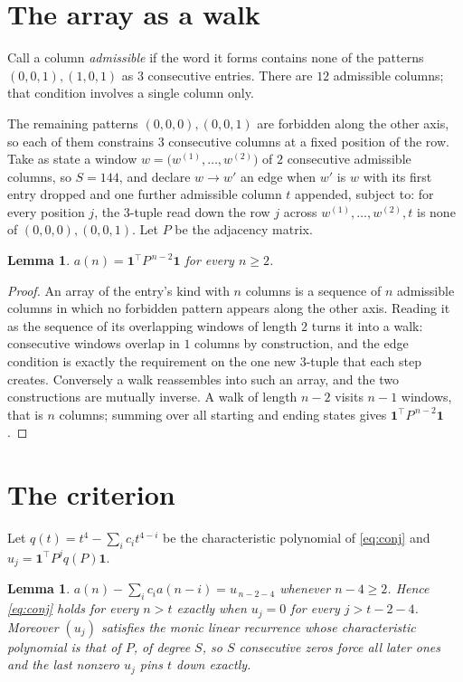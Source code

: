 \documentclass[11pt,a4paper]{article}
\theoremstyle{plain}
\newtheorem{lemma}[theorem]{Lemma}
\theoremstyle{definition}
\begin{document}
\section{The array as a walk}

Call a column \emph{admissible} if the word it forms contains none of the patterns
$(0,0,1), (1,0,1)$ as $3$ consecutive entries. There are $12$ admissible columns; that condition
involves a single column only.

The remaining patterns $(0,0,0), (0,0,1)$ are forbidden along the other axis, so each of them
constrains $3$ consecutive columns at a fixed position of the row. Take as state a
window $w=\bigl(w^{(1)},\dots,w^{(2)}\bigr)$ of $2$ consecutive admissible
columns, so $S=144$, and declare $w\to w'$ an edge when $w'$ is $w$ with its first entry
dropped and one further admissible column $t$ appended, subject to: for every position
$j$, the $3$-tuple read down the row $j$ across $w^{(1)},\dots,w^{(2)},t$
is none of $(0,0,0), (0,0,1)$. Let $P$ be the adjacency matrix.

\begin{lemma}\label{lem:walk}
$a(n)=\mathbf{1}^{\!\top}P^{\,n-2}\mathbf{1}$ for every $n\ge2$.
\end{lemma}

\begin{proof}
An array of the entry's kind with $n$ columns is a sequence of $n$ admissible columns in
which no forbidden pattern appears along the other axis. Reading it as the sequence of its
overlapping windows of length $2$ turns it into a walk: consecutive windows overlap in
$1$ columns by construction, and the edge condition is exactly the requirement on the one
new $3$-tuple that each step creates. Conversely a walk reassembles into such an array,
and the two constructions are mutually inverse. A walk of length $n-2$ visits $n-1$
windows, that is $n$ columns; summing over all starting and ending states gives
$\mathbf{1}^{\!\top}P^{\,n-2}\mathbf{1}$.
\end{proof}

\section{The criterion}

Let $q(t)=t^{4}-\sum_i c_i t^{4-i}$ be the characteristic polynomial of
\eqref{eq:conj} and $u_j=\mathbf{1}^{\!\top}P^{j}q(P)\mathbf{1}$.

\begin{lemma}\label{lem:crit}
$a(n)-\sum_i c_i a(n-i)=u_{\,n-2-4}$ whenever $n-4\ge2$. Hence
\eqref{eq:conj} holds for every $n>t$ exactly when $u_j=0$ for every
$j>t-2-4$. Moreover $(u_j)$ satisfies the monic linear recurrence whose
characteristic polynomial is that of $P$, of degree $S$, so $S$ consecutive zeros force all
later ones and the last nonzero $u_j$ pins $t$ down exactly.
\end{lemma}
\end{document}
